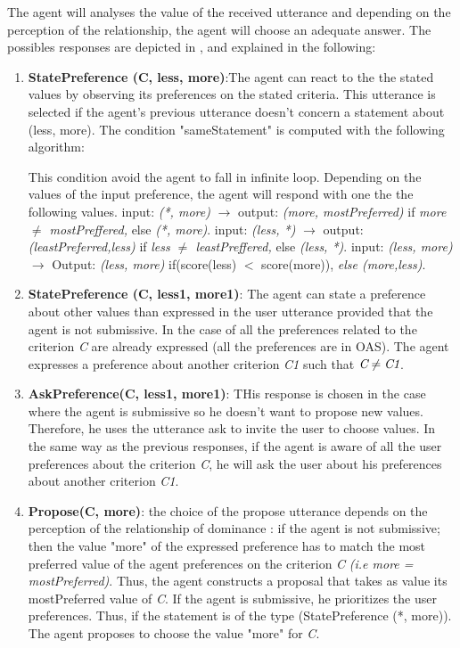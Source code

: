 \documentclass{llncs}
\begin{document}
	\par The agent will analyses the value of the received utterance and depending on the perception of the relationship, the agent will choose  an adequate answer. The possibles responses are depicted in , and explained in the following: 
	\begin{enumerate}
		\item \textbf{StatePreference (C, less, more)}:The agent can react to the the stated values by observing its preferences on the stated criteria. This utterance is selected if the agent's previous utterance doesn't concern a statement about (less, more). 
		The condition "sameStatement" is computed with the following algorithm: 
		
		This condition avoid the agent to fall in infinite loop.  Depending on the values of the input preference, the agent will respond with one the the following values. 
			\subitem input: \textit{(*, more)} $\rightarrow$ 
				output: \textit{(more, mostPreferred)} if \textit{more $\not = $ mostPreffered,} else \textit{(*, more)}.
			\subitem input: \textit{(less, *)} $\rightarrow$ 
				output: \textit{(leastPreferred,less)} if \textit{less $\not = $ leastPreffered,} else \textit{(less, *)}.
			\subitem input: \textit{(less, more)} $\rightarrow$ Output:  \textit{(less, more)} if(score(less) $<$ score(more)), \textit{else (more,less)}.
			
		\item \textbf{StatePreference (C, less1, more1)}: The agent can state a preference about other values than expressed in the user utterance provided that the agent is not submissive. In the case of all the preferences related to the criterion \emph{C} are already expressed (all the preferences are in OAS). The agent expresses a preference about another criterion \emph{C1} such that $\emph{C} \not = \emph{C1}$.
		
		\item \textbf{AskPreference(C, less1, more1)}: THis response is chosen in the case where the agent is submissive so he doesn't want to propose new values. Therefore, he uses the utterance ask to invite the user to choose values. In the same way as the previous responses, if the agent is aware of all the user preferences about the criterion \emph{C}, he will ask the user about his preferences about another criterion \emph{C1}.
		
		
		\item  \textbf{Propose(C, more)}: the choice of the propose utterance depends on the perception of the relationship of dominance : 
			\subitem if the agent is not submissive; then  the value "more" of the expressed preference has to match the most preferred value of the agent preferences on the criterion \emph{C} \textit{(i.e more = mostPreferred)}. Thus, the agent constructs a proposal that takes as value its mostPreferred value of  \emph{C}.
			\subitem If the agent is submissive, he prioritizes the user preferences. Thus, if the statement is of the type (StatePreference (*, more)). The agent proposes to choose the value "more" for \emph{C}.
	\end{enumerate}
\end{document}
